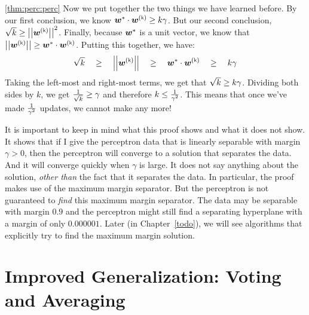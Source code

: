 \begin{myproof}{\ref{thm:perc:perc}}
  Now we put together the two things we have learned before.  By our
  first conclusion, we know $\dotp{\vw^*}{\vw\kth} \geq k \ga$.  But
  our second conclusion, $\sqrt{k} \geq \norm{\vw\kth}^2$.  Finally,
  because ${\boldsymbol{w}}^*$ is a unit vector, we know that $\norm{\vw\kth} \geq
  \dotp{\vw^*}{\vw\kth}$.  Putting this together, we have:
  \begin{equation}
    \sqrt k 
    \quad\geq\quad
    \norm{\vw\kth}
    \quad\geq\quad
    \dotp{\vw^*}{\vw\kth}
    \quad\geq\quad
    k\ga
  \end{equation}
  Taking the left-most and right-most terms, we get that $\sqrt{k}
  \geq k \gamma$.  Dividing both sides by $k$, we get $\frac 1 {\sqrt{k}}
  \geq \gamma$ and therefore $k \leq \frac 1 {\gamma^2}$.  This means
  that once we've made $\frac 1 {\gamma^2}$ updates, we cannot make
  any more!
\end{myproof}



It is important to keep in mind what this proof shows and what it does
not show.  It shows that if I give the perceptron data that is
linearly separable with margin $\gamma > 0$, then the perceptron will
converge to a solution that separates the data.  And it will converge
quickly when $\gamma$ is large.  It does not say anything about the
solution, \emph{other than} the fact that it separates the data.  In
particular, the proof makes use of the maximum margin separator.  But
the perceptron is not guaranteed to \emph{find} this maximum margin
separator.  The data may be separable with margin $0.9$ and the
perceptron might still find a separating hyperplane with a margin of
only $0.000001$.  Later (in Chapter~\ref{todo}), we will see
algorithms that explicitly try to find the maximum margin solution.


\section{Improved Generalization: Voting and Averaging}

